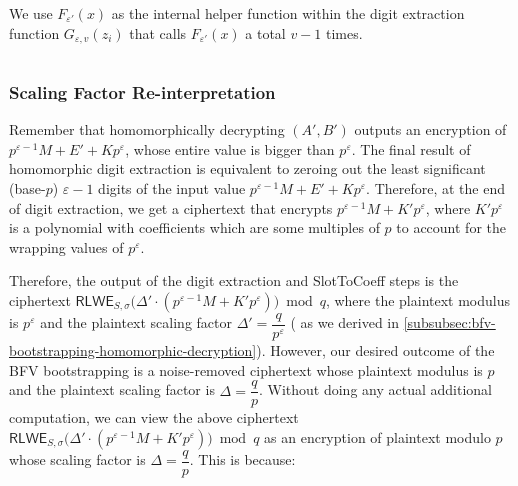 We use $F_{\varepsilon'}(x)$ as the internal helper function within the digit extraction function $G_{\varepsilon,v}(z_i)$ that calls $F_{\varepsilon'}(x)$ a total $v-1$ times.


$ $



\subsubsection{Scaling Factor Re-interpretation} 
\label{subsubsec:bfv-bootstrapping-scaling-factor-reinterpretation}

Remember that homomorphically decrypting $(A', B')$ outputs an encryption of $p^{\varepsilon-1}M + E' + Kp^\varepsilon$, whose entire value is bigger than $p^\varepsilon$. The final result of homomorphic digit extraction is equivalent to zeroing out the least significant (base-$p$) $\varepsilon-1$ digits of the input value $p^{\varepsilon-1}M + E' + Kp^\varepsilon$. Therefore, at the end of digit extraction, we get a ciphertext that encrypts $p^{\varepsilon-1}M + K'p^\varepsilon$, where $K'p^\varepsilon$ is a polynomial with coefficients which are some multiples of $p$ to account for the wrapping values of $p^\varepsilon$. 

Therefore, the output of the digit extraction and \textsf{SlotToCoeff} steps is the ciphertext $\textsf{RLWE}_{S, \sigma}\bm(\Delta' \cdot (p^{\varepsilon-1}M + K'p^\varepsilon)\bm) \bmod q$, where the plaintext modulus is $p^\varepsilon$ and the plaintext scaling factor $\Delta' = \dfrac{q}{p^\varepsilon}$ (
as we derived in \autoref{subsubsec:bfv-bootstrapping-homomorphic-decryption}). However, our desired outcome of the BFV bootstrapping is a noise-removed ciphertext whose plaintext modulus is $p$ and the plaintext scaling factor is $\Delta=\dfrac{q}{p}$. Without doing any actual additional computation, we can view the above ciphertext $\textsf{RLWE}_{S, \sigma}\bm(\Delta' \cdot (p^{\varepsilon-1}M + K'p^\varepsilon)\bm) \bmod q$ as an encryption of plaintext modulo $p$ whose scaling factor is $\Delta = \dfrac{q}{p}$. This is because:


